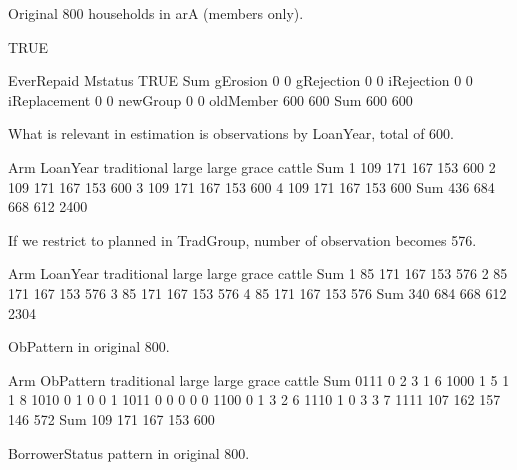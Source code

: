 Original 800 households in \textsf{arA} (members only).
\begin{Schunk}
\begin{Soutput}
[1] TRUE
\end{Soutput}
\begin{Soutput}
              EverRepaid
Mstatus        TRUE Sum
  gErosion        0   0
  gRejection      0   0
  iRejection      0   0
  iReplacement    0   0
  newGroup        0   0
  oldMember     600 600
  Sum           600 600
\end{Soutput}
\end{Schunk}
What is relevant in estimation is observations by \textsf{LoanYear}, total of 600.
\begin{Schunk}
\begin{Soutput}
        Arm
LoanYear traditional large large grace cattle  Sum
     1           109   171         167    153  600
     2           109   171         167    153  600
     3           109   171         167    153  600
     4           109   171         167    153  600
     Sum         436   684         668    612 2400
\end{Soutput}
\end{Schunk}
If we restrict to \textsf{planned} in \textsf{TradGroup}, number of observation becomes 576.
\begin{Schunk}
\begin{Soutput}
        Arm
LoanYear traditional large large grace cattle  Sum
     1            85   171         167    153  576
     2            85   171         167    153  576
     3            85   171         167    153  576
     4            85   171         167    153  576
     Sum         340   684         668    612 2304
\end{Soutput}
\end{Schunk}
\textsf{ObPattern} in original 800.
\begin{Schunk}
\begin{Soutput}
         Arm
ObPattern traditional large large grace cattle Sum
     0111           0     2           3      1   6
     1000           1     5           1      1   8
     1010           0     1           0      0   1
     1011           0     0           0      0   0
     1100           0     1           3      2   6
     1110           1     0           3      3   7
     1111         107   162         157    146 572
     Sum          109   171         167    153 600
\end{Soutput}
\end{Schunk}
\textsf{BorrowerStatus} pattern in original 800.
